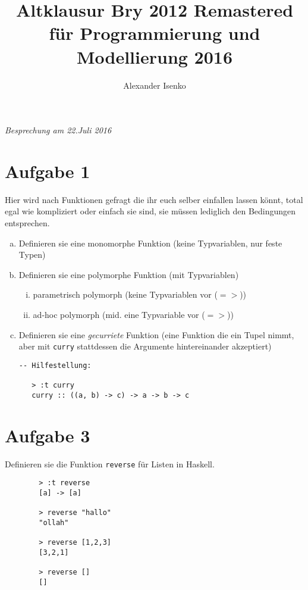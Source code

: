 \documentclass{article}
\title{Altklausur Bry 2012 Remastered für Programmierung und Modellierung 2016}
\author{Alexander Isenko}
\begin{document}
\maketitle

\begin{center}
\textit{Besprechung am 22.Juli 2016}
\end{center}

\section*{Aufgabe 1}
Hier wird nach Funktionen gefragt die ihr euch selber einfallen lassen könnt, total egal wie kompliziert
oder einfach sie sind, sie müssen lediglich den Bedingungen entsprechen.
\begin{enumerate} [a)]
    \item  Definieren sie eine monomorphe Funktion (keine Typvariablen, nur feste Typen)
    \item Definieren sie eine polymorphe Funktion (mit Typvariablen)
        \begin{enumerate}[i)]
            \item parametrisch polymorph  (keine Typvariablen vor ($=>$)) \\
            \item ad-hoc polymorph       (mid. eine Typvariable vor ($=>$)) \\
        \end{enumerate}
    \item  Definieren sie eine \textit{gecurriete} Funktion (eine Funktion die ein Tupel nimmt, aber mit \texttt{curry} stattdessen die Argumente hintereinander akzeptiert)
        \begin{verbatim}
-- Hilfestellung:

   > :t curry
   curry :: ((a, b) -> c) -> a -> b -> c
        \end{verbatim}
\end{enumerate}

\newpage

\section*{Aufgabe 3}
Definieren sie die Funktion \texttt{reverse} für Listen in Haskell.
    \begin{verbatim}
        > :t reverse
        [a] -> [a]

        > reverse "hallo"
        "ollah"
        
        > reverse [1,2,3]
        [3,2,1]
        
        > reverse []
        []
    \end{verbatim}
\end{document}
